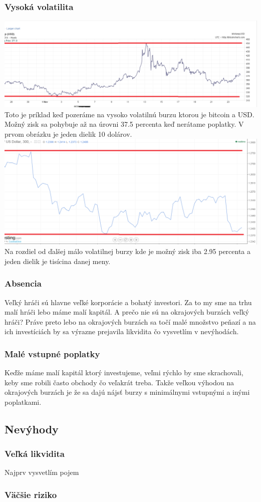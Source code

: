 \subsubsection{Vysoká volatilita}
\includegraphics[width=1\textwidth]{obr}
Toto je príklad keď pozeráme na vysoko volatilnú burzu ktorou je bitcoin a USD. Možný zisk sa pohybuje až na úrovni 37.5 percenta keď nerátame poplatky. V prvom obrázku je jeden dielik 10 dolárov. 
\\
\includegraphics[width=1\textwidth]{obr2}
Na rozdiel od ďalšej málo volatilnej burzy kde je  možný zisk iba 2.95 percenta a jeden dielik je tisícina danej meny.
\subsubsection{Absencia }
Veľký hráči\cite{ZAC} sú hlavne veľké korporácie a bohatý investori. Za to my sme na trhu malí hráči lebo 
máme malí kapitál. A prečo nie sú na okrajových burzách veľký hráči? Práve preto lebo na okrajových burzách sa točí malé množstvo peňazí a na ich investíciách by sa výrazne prejavila likvidita čo vysvetlím v nevýhodách.
\subsubsection{Malé vstupné poplatky}
Keďže máme malí kapitál ktorý investujeme, veľmi rýchlo by sme skrachovali, keby sme robili často obchody čo veľakrát treba. Takže veľkou výhodou na okrajových burzách je že sa dajú nájsť burzy s minimálnymi vstupnými a inými poplatkami.
\subsection{Nevýhody}
\subsubsection{Veľká likvidita}
Najprv vysvetlím pojem 
\subsubsection{Väčšie riziko}
